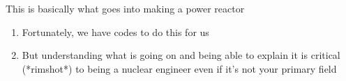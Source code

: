 \documentclass[aspectratio=1610,pdftex,dvipsnames,compress,xcolor={dvipsnames}]{beamer}
\begin{document}
\begin{frame}{This is basically what goes into making a power reactor}
    \begin{enumerate}[series=outerlist,topsep=0pt,itemsep=21pt,leftmargin=*,label=(\arabic*)]
        \item[]Fortunately, we have codes to do this for us
        \item[]But understanding what is going on and being able to explain it is critical (*rimshot*) to being a nuclear engineer even if it's not your primary field
    \end{enumerate}
\end{frame}








%
%
%
%
\end{document}
